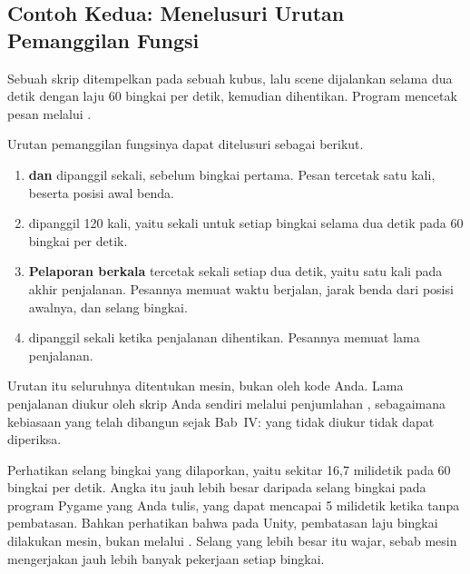 \subsection{Contoh Kedua: Menelusuri Urutan Pemanggilan Fungsi}

\begin{contohbox}
Sebuah skrip ditempelkan pada sebuah kubus, lalu scene dijalankan selama dua
detik dengan laju 60 bingkai per detik, kemudian dihentikan. Program
mencetak pesan melalui .
\end{contohbox}

Urutan pemanggilan fungsinya dapat ditelusuri sebagai berikut.

\begin{enumerate}
  \item \textbf{ dan } dipanggil sekali, sebelum bingkai
        pertama. Pesan  tercetak satu kali, beserta posisi awal
        benda.
  \item \textbf{} dipanggil 120 kali, yaitu sekali untuk setiap
        bingkai selama dua detik pada 60 bingkai per detik.
  \item \textbf{Pelaporan berkala} tercetak sekali setiap dua detik, yaitu satu
        kali pada akhir penjalanan. Pesannya memuat waktu berjalan, jarak benda
        dari posisi awalnya, dan selang bingkai.
  \item \textbf{} dipanggil sekali ketika penjalanan dihentikan.
        Pesannya memuat lama penjalanan.
\end{enumerate}

Urutan itu seluruhnya ditentukan mesin, bukan oleh kode Anda.
Lama penjalanan diukur oleh skrip Anda sendiri melalui
penjumlahan , sebagaimana kebiasaan yang telah dibangun
sejak Bab~IV: yang tidak diukur tidak dapat diperiksa.

\begin{catatabox}
Perhatikan selang bingkai yang dilaporkan, yaitu sekitar 16,7 milidetik pada 60
bingkai per detik. Angka itu jauh lebih besar daripada selang bingkai pada
program Pygame yang Anda tulis, yang dapat mencapai 5 milidetik ketika tanpa
pembatasan. Bahkan perhatikan bahwa pada Unity, pembatasan laju bingkai
dilakukan mesin, bukan melalui . Selang yang lebih besar itu
wajar, sebab mesin mengerjakan jauh lebih banyak pekerjaan setiap bingkai.
\end{catatabox}
